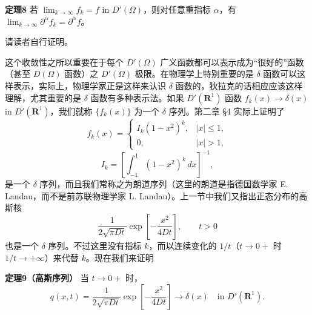 \noindent\textbf{定理8}
若 $\lim_{k\to\infty}f_k=f$ in $D'(\Omega)$，则对任意重指标 $\alpha$，有 $\lim_{k\to\infty}\partial^\alpha f_k=\partial^\alpha f$。

请读者自行证明。

这个收敛性之所以重要在于每个 $D'(\Omega)$ 广义函数都可以表示成为“很好的”函数（甚至 $D(\Omega)$ 函数）之 $D'(\Omega)$ 极限。在物理学上特别重要的是 $\delta$ 函数可以这样表示，实际上，物理学家正是这样来认识 $\delta$ 函数的，狄拉克的话相应应该这样理解，尤其重要的是 $\delta$ 函数有多种表示法。如果 $D'(\mathbf R^1)$ 函数 $f_k(x)\to\delta(x)$ in $D'(\mathbf R^1)$，我们就称 $\{f_k(x)\}$ 为一个 $\delta$ 序列。第二章 §4 实际上证明了
\begin{equation}
 f_k(x)=
 \begin{cases}
 I_k(1-x^2)^k,&|x|\le1,\\
 0,&|x|>1,
 \end{cases}
 \tag{31}
\end{equation}
\[
 I_k=\left[\int_{-1}^1(1-x^2)^k\,dx\right]^{-1},
\]
是一个 $\delta$ 序列，而且我们常称之为朗道序列（这里的朗道是指德国数学家 E. Landau，而不是前苏联物理学家 L. Landau）。上一节中我们又指出正态分布的高斯核
\[
 \frac1{2\sqrt{\pi Dt}}\exp\!\left[-\frac{x^2}{4Dt}\right],\qquad t>0
\]
也是一个 $\delta$ 序列。不过这里没有指标 $k$，而以连续变化的 $1/t$（$t\to0+$ 时 $1/t\to+\infty$）来代替 $k$。现在我们来证明

\noindent\textbf{定理9（高斯序列）}
当 $t\to0+$ 时，
\[
 q(x,t)=\frac1{2\sqrt{\pi Dt}}\exp\!\left[-\frac{x^2}{4Dt}\right]\to\delta(x)
 \quad\text{in }D'(\mathbf R^1).
\]

